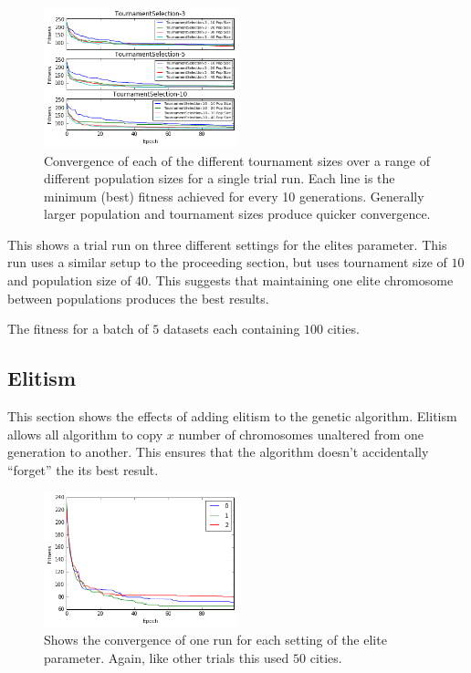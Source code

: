 \documentclass[journal]{IEEEtran}
\begin{document}
\begin{figure}[H]
\centering
\includegraphics[width=0.5\textwidth]{figures/selection_vs_pop_size_convergence.png}
\caption{Convergence of each of the different tournament sizes over a range of different population sizes for a single trial run. Each line is the minimum (best) fitness achieved for every 10 generations. Generally larger population and tournament sizes produce quicker convergence.}
\label{fig:tournament-selection-convergence}
\end{figure}

\begin{table}[t]
\centering

\caption{This shows a trial run on three different settings for the elites parameter. This run uses a similar setup to the proceeding section, but uses tournament size of $10$ and population size of $40$. This suggests that maintaining one elite chromosome between populations produces the best results.}
\label{table:elite-fitness}
\end{table}

\begin{table}[t]
\centering

\caption{The fitness for a batch of $5$ datasets each containing $100$ cities.}
\label{table:knn-fitness}
\end{table}

\subsection{Elitism}
This section shows the effects of adding elitism to the genetic algorithm. Elitism allows all algorithm to copy $x$ number of chromosomes unaltered from one generation to another. This ensures that the algorithm doesn't accidentally ``forget'' the its best result.


\begin{figure}[H]
\centering
\includegraphics[width=0.5\textwidth]{figures/elite_convergence.png}
\caption{Shows the convergence of one run for each setting of the elite parameter. Again, like other trials this used $50$ cities.}
\label{fig:elite-convergence}
\end{figure}
\end{document}
